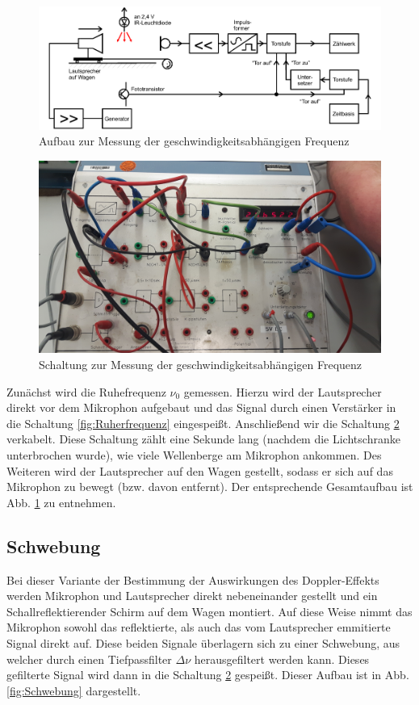\begin{figure}
  \centering
  \includegraphics[width = \textwidth]{./Abbildungen/Unbenann.PNG}
  \caption{Aufbau zur Messung der geschwindigkeitsabhängigen Frequenz}
  \label{fig:vf}
\end{figure}

\begin{figure}
  \centering
  \includegraphics[width = \textwidth]{./Abbildungen/Frequenzmessung-Schranken.jpg}
  \caption{Schaltung zur Messung der geschwindigkeitsabhängigen Frequenz}
  \label{fig:vf-Schaltung}
\end{figure}

Zunächst wird die Ruhefrequenz $\nu_0$ gemessen. Hierzu wird der Lautsprecher direkt vor dem Mikrophon aufgebaut und das Signal durch einen Verstärker in die Schaltung \ref{fig:Ruherfrequenz} eingespeißt. Anschließend wir die Schaltung \ref{fig:vf-Schaltung} verkabelt. Diese Schaltung zählt eine Sekunde lang (nachdem die Lichtschranke unterbrochen wurde), wie viele Wellenberge am Mikrophon ankommen. Des Weiteren wird der Lautsprecher auf den Wagen gestellt, sodass er sich auf das Mikrophon zu bewegt (bzw. davon entfernt). Der entsprechende Gesamtaufbau ist Abb. \ref{fig:vf} zu entnehmen.

\subsection{Schwebung}
\label{sec:Schwebung}
Bei dieser Variante der Bestimmung der Auswirkungen des Doppler-Effekts werden Mikrophon und Lautsprecher direkt nebeneinander gestellt und ein Schallreflektierender Schirm auf dem Wagen montiert. Auf diese Weise nimmt das Mikrophon sowohl das reflektierte, als auch das vom Lautsprecher emmitierte Signal direkt auf. Diese beiden Signale überlagern sich zu einer Schwebung, aus welcher durch einen Tiefpassfilter $\Delta \nu$ herausgefiltert werden kann. Dieses gefilterte Signal wird dann in die Schaltung \ref{fig:vf-Schaltung} gespeißt. Dieser Aufbau ist in Abb. \ref{fig:Schwebung} dargestellt.

